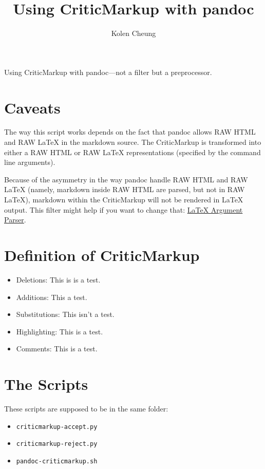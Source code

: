 \documentclass[]{article}
\title{Using CriticMarkup with pandoc}
\author{Kolen Cheung}
\date{}
\providecommand{\tightlist}{%
  \setlength{\itemsep}{0pt}\setlength{\parskip}{0pt}}
\begin{document}
\maketitle

Using CriticMarkup with pandoc---not a filter but a preprocessor.

\section{Caveats}\label{caveats}

The way this script works depends on the fact that pandoc allows RAW
HTML and RAW LaTeX in the markdown source. The CriticMarkup is
transformed into either a RAW HTML or RAW LaTeX representations
(specified by the command line arguments).

Because of the asymmetry in the way pandoc handle RAW HTML and RAW LaTeX
(namely, markdown inside RAW HTML are parsed, but not in RAW LaTeX),
markdown within the CriticMarkup will not be rendered in LaTeX output.
This filter might help if you want to change that:
\href{https://gist.github.com/mpickering/f1718fcdc4c56273ed52}{LaTeX
Argument Parser}.

\section{Definition of CriticMarkup}\label{definition-of-criticmarkup}

\begin{itemize}
\tightlist
\item
  Deletions: This is is a test.
\item
  Additions: This a test.
\item
  Substitutions: This isn't a test.
\item
  Highlighting: This is a test.
\item
  Comments: This is a test.
\end{itemize}

\section{The Scripts}\label{the-scripts}

These scripts are supposed to be in the same folder:

\begin{itemize}
\tightlist
\item
  \texttt{criticmarkup-accept.py}
\item
  \texttt{criticmarkup-reject.py}
\item
  \texttt{pandoc-criticmarkup.sh}
\end{itemize}
\end{document}

